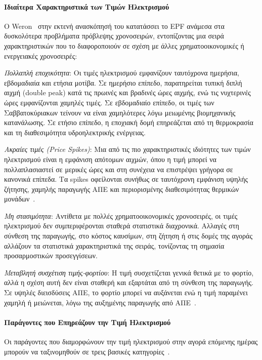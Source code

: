 \paragraph{Ιδιαίτερα Χαρακτηριστικά των Τιμών Ηλεκτρισμού}

Ο Weron~\cite{weron2014electricity} στην εκτενή ανασκόπησή του κατατάσσει το EPF ανάμεσα
στα δυσκολότερα προβλήματα πρόβλεψης χρονοσειρών, εντοπίζοντας μια σειρά χαρακτηριστικών
που το διαφοροποιούν σε σχέση με άλλες χρηματοοικονομικές ή ενεργειακές χρονοσειρές:

\textit{Πολλαπλή εποχικότητα}: Οι τιμές ηλεκτρισμού εμφανίζουν ταυτόχρονα ημερήσια,
εβδομαδιαία και ετήσια μοτίβα. Σε ημερήσιο επίπεδο, παρατηρείται τυπική διπλή αιχμή
(double peak) κατά τις πρωινές και βραδινές ώρες αιχμής, ενώ τις νυχτερινές ώρες
εμφανίζονται χαμηλές τιμές. Σε εβδομαδιαίο επίπεδο, οι τιμές των Σαββατοκύριακων τείνουν
να είναι χαμηλότερες λόγω μειωμένης βιομηχανικής κατανάλωσης. Σε ετήσιο επίπεδο, η
εποχιακή δομή επηρεάζεται από τη θερμοκρασία και τη διαθεσιμότητα υδροηλεκτρικής ενέργειας.

\textit{Ακραίες τιμές (Price Spikes)}: Μια από τις πιο χαρακτηριστικές ιδιότητες των
τιμών ηλεκτρισμού είναι η εμφάνιση απότομων αιχμών, όπου η τιμή μπορεί να
πολλαπλασιαστεί σε μερικές ώρες και στη συνέχεια να επιστρέψει γρήγορα σε κανονικά
επίπεδα. Τα spikes οφείλονται συνήθως σε ταυτόχρονη εμφάνιση υψηλής ζήτησης,
χαμηλής παραγωγής ΑΠΕ και περιορισμένης διαθεσιμότητας θερμικών μονάδων~\cite{weron2014electricity}.

\textit{Μη στασιμότητα}: Αντίθετα με πολλές χρηματοοικονομικές χρονοσειρές, οι τιμές
ηλεκτρισμού δεν συμπεριφέρονται σταθερά στατιστικά διαχρονικά. Αλλαγές στη σύνθεση
της παραγωγής, στο κόστος καυσίμων, στη ζήτηση ή στις δομές της αγοράς αλλάζουν
τα στατιστικά χαρακτηριστικά της σειράς, τονίζοντας τη σημασία προσαρμοστικών προσεγγίσεων.

\textit{Μεταβλητή συσχέτιση τιμής-φορτίου}: Η τιμή συσχετίζεται γενικά θετικά με
το φορτίο, αλλά η σχέση αυτή δεν είναι σταθερή και εξαρτάται από τη σύνθεση της
παραγωγής. Σε υψηλές διεισδύσεις ΑΠΕ, το φορτίο μπορεί να αυξάνεται ενώ η τιμή
παραμένει χαμηλή ή μειώνεται, λόγω της αυξημένης παραγωγής από ΑΠΕ~\cite{weron2014electricity}.

\paragraph{Παράγοντες που Επηρεάζουν την Τιμή Ηλεκτρισμού}

Οι παράγοντες που διαμορφώνουν την τιμή ηλεκτρισμού στην αγορά επόμενης ημέρας μπορούν
να ταξινομηθούν σε τρεις βασικές κατηγορίες~\cite{weron2014electricity, lago2021}.

